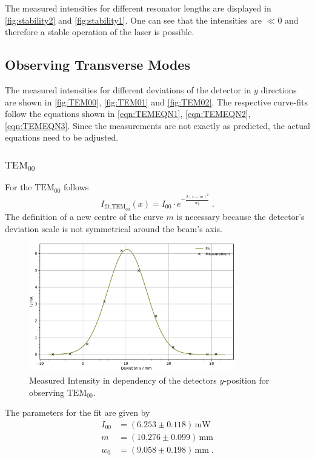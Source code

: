 The measured intensities for different resonator lengths are displayed in \autoref{fig:stability2} and \autoref{fig:stability1}. One can see that the intensities are $\ll 0$ and therefore a stable operation of the laser is possible.

\subsection{Observing Transverse Modes}

The measured intensities for different deviations of the detector in $y$ directions are shown in \autoref{fig:TEM00}, \autoref{fig:TEM01} and \autoref{fig:TEM02}. The respective curve-fits follow the equations shown in \eqref{eqn:TEMEQN1}, \eqref{eqn:TEMEQN2}, \eqref{eqn:TEMEQN3}. Since the measurements are not exactly as 
predicted, the actual equations need to be adjusted.

\subsubsection{$\text{TEM}_{00}$}

For the $\text{TEM}_{00}$ follows 
\begin{equation*}
    I_{\text{fit,TEM}_{00}}(x) = I_{00} \cdot e^{-\frac{2 (x - m)^2}{w_0^2}}\; .
\end{equation*}
The definition of a new centre of the curve $m$ is necessary because the detector's deviation scale is not symmetrical around the beam's axis.
\begin{figure}
	\centering
	\includegraphics[width=0.8\textwidth]{content/plots/TEM00.pdf}
	\caption{Measured Intensity in dependency of the detectors $y$-position for observing $\text{TEM}_{00}$.}
	\label{fig:TEM00}
\end{figure}
The parameters for the fit are given by
\begin{align*}
    I_{00} &= (6.253\pm 0.118) \, \unit{\milli \watt}\\
    m &= (10.276\pm 0.099)\, \unit{\milli \meter}\\
    w_0 &= (9.058\pm 0.198) \, \unit{\milli \meter}\; .
\end{align*}

